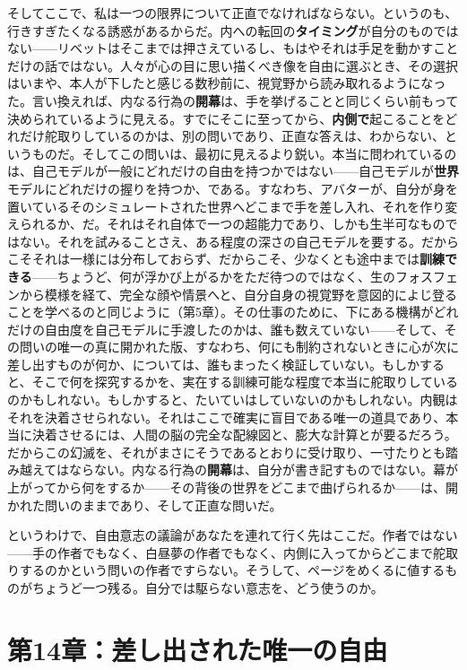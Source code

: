 \documentclass[11pt, twoside, openright]{book}
\begin{document}
そしてここで、私は一つの限界について正直でなければならない。というのも、行きすぎたくなる誘惑があるからだ。内への転回の\textbf{タイミング}が自分のものではない------リベットはそこまでは押さえているし、もはやそれは手足を動かすことだけの話ではない。人々が心の目に思い描くべき像を自由に選ぶとき、その選択はいまや、本人が下したと感じる数秒前に、視覚野から読み取れるようになった。言い換えれば、内なる行為の\textbf{開幕}は、手を挙げることと同じくらい前もって決められているように見える。すでにそこに至ってから、\textbf{内側で}起こることをどれだけ舵取りしているのかは、別の問いであり、正直な答えは、わからない、というものだ。そしてこの問いは、最初に見えるより鋭い。本当に問われているのは、自己モデルが一般にどれだけの自由を持つかではない------自己モデルが\textbf{世界}モデルにどれだけの握りを持つか、である。すなわち、アバターが、自分が身を置いているそのシミュレートされた世界へどこまで手を差し入れ、それを作り変えられるか、だ。それはそれ自体で一つの超能力であり、しかも生半可なものではない。それを試みることさえ、ある程度の深さの自己モデルを要する。だからこそそれは一様には分布しておらず、だからこそ、少なくとも途中までは\textbf{訓練できる}------ちょうど、何が浮かび上がるかをただ待つのではなく、生のフォスフェンから模様を経て、完全な顔や情景へと、自分自身の視覚野を意図的によじ登ることを学べるのと同じように（第5章）。その仕事のために、下にある機構がどれだけの自由度を自己モデルに手渡したのかは、誰も数えていない------そして、その問いの唯一の真に開かれた版、すなわち、何にも制約されないときに心が次に差し出すものが何か、については、誰もまったく検証していない。もしかすると、そこで何を探究するかを、実在する訓練可能な程度で本当に舵取りしているのかもしれない。もしかすると、たいていはしていないのかもしれない。内観はそれを決着させられない。それはここで確実に盲目である唯一の道具であり、本当に決着させるには、人間の脳の完全な配線図と、膨大な計算とが要るだろう。だからこの幻滅を、それがまさにそうであるとおりに受け取り、一寸たりとも踏み越えてはならない。内なる行為の\textbf{開幕}は、自分が書き記すものではない。幕が上がってから何をするか------その背後の世界をどこまで曲げられるか------は、開かれた問いのままであり、そして正直な問いだ。

というわけで、自由意志の議論があなたを連れて行く先はここだ。作者ではない------手の作者でもなく、白昼夢の作者でもなく、内側に入ってからどこまで舵取りするのかという問いの作者ですらない。そうして、ページをめくるに値するものがちょうど一つ残る。自分では駆らない意志を、どう使うのか。


\chapter*{第14章：差し出された唯一の自由}
\end{document}
